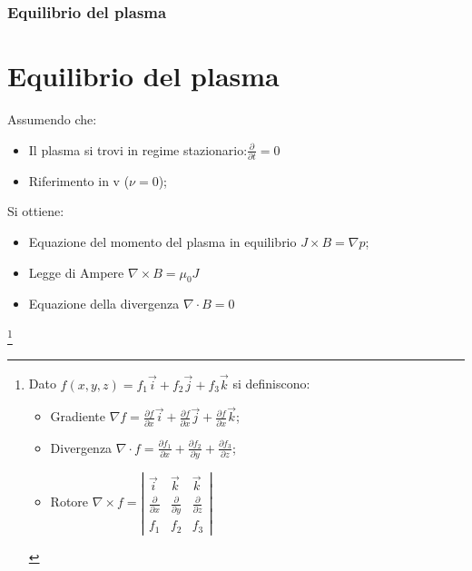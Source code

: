\documentclass{beamer}
\begin{document}
\begin{frame}
	\frametitle{Equilibrio del plasma}
	\section{Equilibrio del plasma}
	Assumendo che:
	\begin{itemize}
		\item Il plasma si trovi in regime stazionario:\( \frac{\partial}{\partial t}=0\)
		\item Riferimento in v (\(\nu=0\));
	\end{itemize}
	Si ottiene:
	\begin{itemize}
		\item Equazione del momento del plasma in equilibrio \(J\times B=\nabla p\);
		\item Legge di Ampere \(\nabla\times B=\mu_{0}J\)
		\item Equazione della divergenza \(\nabla\cdot B=0\)
	\end{itemize}
\footnote{
	Dato \(f(x,y,z)=f_{1}\overrightarrow{i}+f_{2}\overrightarrow{j}+f_{3}\overrightarrow{k}\) si definiscono:
	\begin{itemize}
		\item Gradiente  \(\nabla f = \frac{\partial f}{\partial x}\overrightarrow{i}+\frac{\partial f}{\partial x}\overrightarrow{j}+\frac{\partial f}{\partial x}\overrightarrow{k} \);
		\item Divergenza \(\nabla\cdot f=\frac{\partial f_{1}}{\partial x}+\frac{\partial f_{2}}{\partial y}+\frac{\partial f_{3}}{\partial z}\);
		\item Rotore \(\nabla\times f=\left\lvert \begin{matrix}
			\overrightarrow{i}&\overrightarrow{k}&\overrightarrow{k}\\
			\frac{\partial}{\partial x}& \frac{\partial}{\partial y}&\frac{\partial}{\partial z}\\
			f_{1}&f_{2}&f_{3}
		\end{matrix}\right\rvert \)
	\end{itemize}
}
\end{frame}
\end{document}
